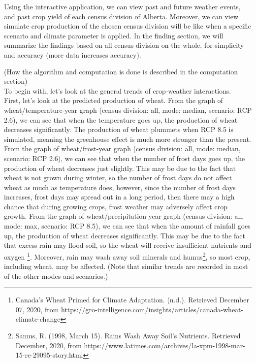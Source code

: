 \documentclass[fontsize=11pt]{article}
\begin{document}
Using the interactive application, we can view past and future weather events, and past crop yield of each census division of Alberta. Moreover, we can view simulate crop production of the chosen census division will be like when a specific scenario and climate parameter is applied. In the finding section, we will summarize the findings based on all census division on the whole, for simplicity and accuracy (more data increases accuracy).

(How the algorithm and computation is done is described in the computation section) \\

To begin with, let's look at the general trends of crop-weather interactions. \\

First, let's look at the predicted production of wheat. From the graph of wheat/temperature-year graph (census division: all, mode: median, scenario: RCP 2.6), we can see that when the temperature goes up, the production of wheat decreases significantly. The production of wheat plummets when RCP 8.5 is simulated, meaning the greenhouse effect is much more stronger than the present. From the graph of wheat/frost-year graph (census division: all, mode: median, scenario: RCP 2.6), we can see that when the number of frost days goes up, the production of wheat decreases just slightly. This may be due to the fact that wheat is not grown during winter, so the number of frost days do not affect wheat as much as temperature does, however, since the number of frost days increases, frost days may spread out in a long period, then there may a high chance that during growing crops, frost weather may adversely affect crop growth. From the graph of wheat/precipitation-year graph (census division: all, mode: max, scenario: RCP 8.5), we can see that when the amount of rainfall goes up, the production of wheat decreases significantly. This may be due to the fact that excess rain may flood soil, so the wheat will receive insufficient nutrients and oxygen \footnote{Canada's Wheat Primed for Climate Adaptation. (n.d.). Retrieved December 07, 2020, from https://gro-intelligence.com/insights/articles/canada-wheat-climate-change}. Moreover, rain may wash away soil minerals and humus\footnote{Samus, R. (1998, March 15). Rains Wash Away Soil's Nutrients. Retrieved December, 2020, from https://www.latimes.com/archives/la-xpm-1998-mar-15-re-29095-story.html}, so most crop, including wheat, may be affected.
(Note that similar trends are recorded in most of the other modes and scenarios.) \\
\end{document}
